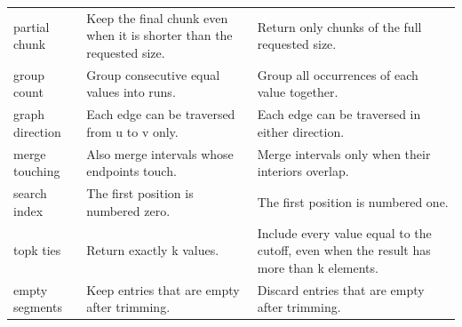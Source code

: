 \begin{table}[!htbp]
\begin{tabularx}{\linewidth}{@{}>{\raggedright\arraybackslash}p{.18\linewidth}>{\raggedright\arraybackslash}X>{\raggedright\arraybackslash}X@{}}
partial chunk & Keep the final chunk even when it is shorter than the requested size. & Return only chunks of the full requested size. \\
group count & Group consecutive equal values into runs. & Group all occurrences of each value together. \\
graph direction & Each edge can be traversed from u to v only. & Each edge can be traversed in either direction. \\
merge touching & Also merge intervals whose endpoints touch. & Merge intervals only when their interiors overlap. \\
search index & The first position is numbered zero. & The first position is numbered one. \\
topk ties & Return exactly k values. & Include every value equal to the cutoff, even when the result has more than k elements. \\
empty segments & Keep entries that are empty after trimming. & Discard entries that are empty after trimming. \\
\bottomrule
\end{tabularx}

\end{table}

